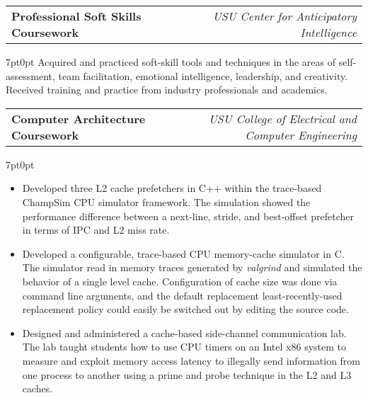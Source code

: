 \documentclass[letterpaper,12pt]{article}
\makeatletter
\newcommand{\simpleHeading}[2]{
    \vspace{-1pt}
    \begin{tabular*}{0.99\textwidth}[t]{l@{\extracolsep{\fill}}r}
        #1 & #2 \\
    \end{tabular*}
}
\newcommand{\positionHeading}[4]{
    \simpleHeading{\textbf{#1}}{\textit{#2}}
    \simpleHeading{\textit{#3}}{\textit{#4}}
}
\newcommand{\simpleParagraph}[1]{
    \vspace{-1pt}
    \begin{adjustwidth}{7pt}{0pt}
        #1
    \end{adjustwidth}
}
\makeatother
\begin{document}



    \vspace{10pt}
    \simpleHeading{\textbf{Professional Soft Skills Coursework}}{\textit{USU Center for Anticipatory Intelligence}}

    \simpleParagraph{Acquired and practiced soft-skill tools and techniques in the areas of self-assessment, team
    facilitation, emotional intelligence, leadership, and creativity. Received training and practice
    from industry professionals and academics.}
    
    \vspace{10pt}
    \simpleHeading{\textbf{Computer Architecture Coursework}}
                  {\textit{USU College of Electrical and Computer Engineering}}

    \simpleParagraph{
        \begin{itemize}
            \item Developed three L2 cache prefetchers in C++ within the trace-based ChampSim CPU
                simulator framework. The simulation showed the performance difference between a next-line, stride,
                and best-offset prefetcher in terms of IPC and L2 miss rate.

            \item Developed a configurable, trace-based CPU memory-cache simulator in C. The simulator
                read in memory traces generated by \textit{valgrind} and simulated the behavior of a single 
                level cache. Configuration of cache size was done via command line arguments, and the default
                replacement least-recently-used replacement policy could easily be switched out by editing the 
                source code.

            \item Designed and administered a cache-based side-channel communication lab. The lab taught
                students how to use CPU timers on an Intel x86 system to measure and exploit memory access 
                latency to illegally send information from one process to another using a prime and probe 
                technique in the L2 and L3 caches.

        \end{itemize}
    }
\end{document}
